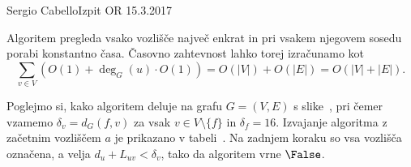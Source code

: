 \begin{naloga}{Sergio Cabello}{Izpit OR 15.3.2017}
\begin{odgovor}
Algoritem pregleda vsako vozlišče največ enkrat in pri vsakem njegovem sosedu porabi konstantno časa.
Časovno zahtevnost lahko torej izračunamo kot 
$$
\sum_{v \in V}\left(O(1) + \deg_G(u) \cdot O(1)\right)
= O(|V|) + O(|E|) = O(|V| + |E|).
$$

Poglejmo si, kako algoritem deluje na grafu $G = (V, E)$ s slike~\fig,
pri čemer vzamemo $\delta_v = d_G(f, v)$ za vsak $v \in V \setminus \{f\}$
in $\delta_f = 16$.
Izvajanje algoritma z začetnim vozliščem $a$ je prikazano v tabeli~\tab.
Na zadnjem koraku so vsa vozlišča označena, a velja $d_u + L_{uv} < \delta_v$,
tako da algoritem vrne $\False$.

\begin{slika}
\pgfslika
{}
\end{slika}

\begin{tabela}
\end{tabela}

\end{odgovor}
\end{naloga}
